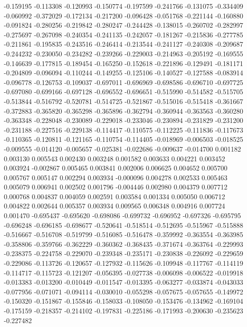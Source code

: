 -0.159195
-0.113308
-0.120993
-0.150774
-0.197599
-0.241766
-0.131075
-0.334409
-0.060992
-0.372029
-0.172134
-0.217200
-0.096428
-0.051768
-0.221144
-0.160880
-0.091824
-0.280256
-0.219842
-0.280247
-0.244428
-0.138015
-0.260702
-0.282997
-0.275697
-0.267098
-0.240354
-0.241135
-0.242057
-0.181267
-0.215836
-0.277785
-0.211861
-0.195835
-0.243516
-0.246414
-0.213544
-0.241127
-0.240308
-0.209687
-0.244232
-0.230050
-0.234282
-0.239266
-0.229003
-0.214963
-0.205192
-0.169555
-0.146639
-0.177815
-0.189454
-0.165250
-0.152618
-0.221896
-0.129491
-0.181171
-0.204809
-0.096094
-0.110244
-0.149255
-0.125106
-0.140527
-0.127588
-0.083914
-0.096778
-0.126753
-0.109037
-0.697011
-0.696969
-0.698586
-0.696710
-0.697725
-0.697080
-0.699166
-0.697128
-0.696552
-0.696651
-0.515990
-0.514582
-0.515705
-0.513844
-0.516792
-0.520781
-0.514725
-0.521867
-0.515016
-0.515418
-0.361667
-0.372883
-0.365820
-0.365298
-0.365896
-0.362794
-0.360944
-0.363563
-0.360280
-0.363348
-0.228048
-0.230089
-0.229018
-0.233046
-0.230894
-0.231829
-0.231200
-0.231188
-0.227516
-0.229138
-0.114417
-0.110575
-0.112225
-0.111836
-0.117673
-0.110365
-0.120811
-0.121165
-0.110754
-0.114405
-0.018969
-0.006503
-0.018525
-0.009555
-0.014120
-0.005657
-0.025381
-0.022686
-0.009637
-0.014700
0.001182
0.003130
0.005543
0.002430
0.003248
0.001582
0.003633
0.004221
0.003452
0.003924
-0.002867
0.005465
0.003841
0.002006
0.006625
0.004652
0.005700
0.005767
0.005147
0.002294
0.003934
-0.000096
0.004278
0.002533
0.005463
0.005079
0.006941
0.002502
0.001796
-0.004446
0.002980
0.004379
0.007712
0.000768
0.004837
0.004059
0.002591
0.003584
0.001334
0.005050
0.006712
0.004822
0.002644
0.005357
0.003934
0.009565
0.006348
0.004916
0.007724
0.001470
-0.695437
-0.695620
-0.698086
-0.699732
-0.696952
-0.697326
-0.695795
-0.696248
-0.696185
-0.698677
-0.520641
-0.518514
-0.512695
-0.515967
-0.515888
-0.516667
-0.516708
-0.519799
-0.516085
-0.516478
-0.359992
-0.363554
-0.363985
-0.358806
-0.359766
-0.362229
-0.360362
-0.368435
-0.371674
-0.363764
-0.229993
-0.238375
-0.224758
-0.229070
-0.239348
-0.235171
-0.230838
-0.226092
-0.229659
-0.229086
-0.113726
-0.120657
-0.127932
-0.115626
-0.109948
-0.117767
-0.114119
-0.114717
-0.115723
-0.121207
-0.056395
-0.027738
-0.006098
-0.006522
-0.019918
-0.013383
-0.013200
-0.010449
-0.011547
-0.013395
-0.063277
-0.033874
-0.043033
-0.077956
-0.071071
-0.094114
-0.030010
-0.055298
-0.057675
-0.057655
-0.149972
-0.150320
-0.151867
-0.155846
-0.158033
-0.108050
-0.153476
-0.134962
-0.169104
-0.175159
-0.218357
-0.214102
-0.197831
-0.225186
-0.171993
-0.200630
-0.235623
-0.227482
